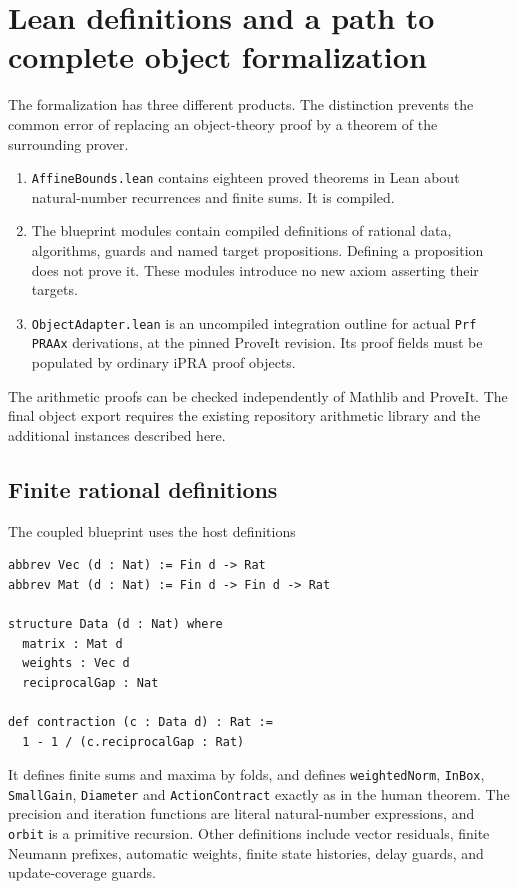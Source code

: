 \section{Lean definitions and a path to complete object formalization}
\label{sec:formalization}

The formalization has three different products. The distinction prevents
the common error of replacing an object-theory proof by a theorem of
the surrounding prover.

\begin{enumerate}
\item \texttt{AffineBounds.lean} contains eighteen proved theorems in
Lean about natural-number recurrences and finite sums. It is compiled.
\item The blueprint modules contain compiled definitions of rational
data, algorithms, guards and named target propositions. Defining a
proposition does not prove it. These modules introduce no new axiom
asserting their targets.
\item \texttt{ObjectAdapter.lean} is an uncompiled integration outline
for actual \texttt{Prf PRAAx} derivations, at the pinned ProveIt
revision. Its proof fields must be populated by ordinary iPRA proof
objects.
\end{enumerate}

The arithmetic proofs can be checked independently of Mathlib and
ProveIt. The final object export requires the existing repository
arithmetic library and the additional instances described here.

\subsection{Finite rational definitions}

The coupled blueprint uses the host definitions
\begin{lstlisting}
abbrev Vec (d : Nat) := Fin d -> Rat
abbrev Mat (d : Nat) := Fin d -> Fin d -> Rat

structure Data (d : Nat) where
  matrix : Mat d
  weights : Vec d
  reciprocalGap : Nat

def contraction (c : Data d) : Rat :=
  1 - 1 / (c.reciprocalGap : Rat)
\end{lstlisting}

It defines finite sums and maxima by folds, and defines
\texttt{weightedNorm}, \texttt{InBox}, \texttt{SmallGain},
\texttt{Diameter} and \texttt{ActionContract} exactly as in the
human theorem. The precision and iteration functions are literal
natural-number expressions, and \texttt{orbit} is a primitive
recursion. Other definitions include vector residuals, finite Neumann
prefixes, automatic weights, finite state histories, delay guards,
and update-coverage guards.

